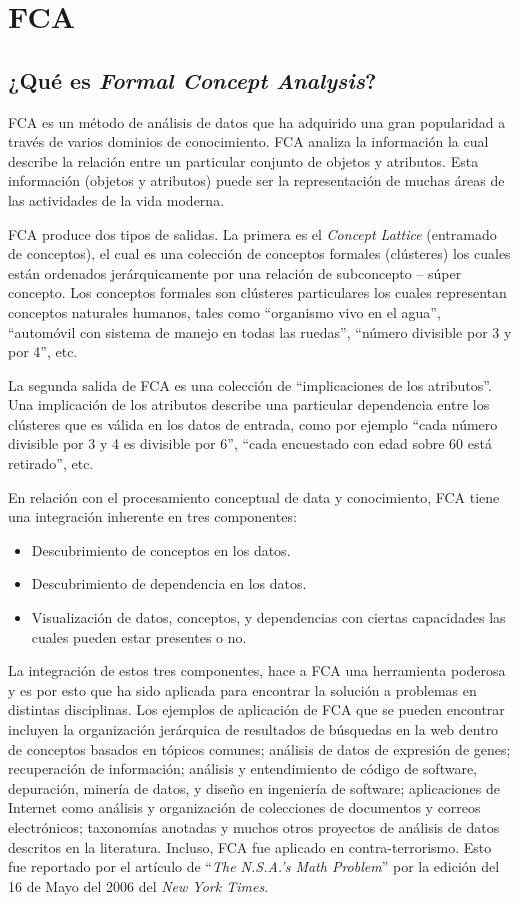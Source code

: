 \documentclass[12pt,oneside,letterpaper]{book}
\newcommand{\eng}[1]{\textit{#1}\xspace}			%
\newcommand{\abr}[1]{\textsc{#1}\xspace}           %
\theoremstyle{definition}
\begin{document}
\section{FCA}
\label{sec:fca}
\subsection{¿Qué es \eng{Formal Concept Analysis}?}
\label{sub:que_es_formal_concept_analysis}
\abr{FCA} es un método de análisis de datos que ha adquirido una gran popularidad a través de varios dominios de conocimiento.  \abr{FCA} analiza la información la cual describe la relación entre un particular conjunto de objetos y atributos. Esta información (objetos y atributos) puede ser la representación de muchas áreas de las actividades de la vida moderna.

\abr{FCA} produce dos tipos de salidas. La primera es el \eng{Concept Lattice} (entramado de conceptos), el cual es una colección de conceptos formales (clústeres) los cuales están ordenados jerárquicamente por una relación de subconcepto – súper concepto. Los conceptos formales son clústeres particulares los cuales representan conceptos naturales humanos, tales como ``organismo vivo en el agua'',  ``automóvil con sistema de manejo en todas las ruedas'', ``número divisible por 3 y por 4'', etc.

La segunda salida de \abr{FCA} es una colección de ``implicaciones de los atributos''. Una implicación de los atributos describe una particular dependencia entre los clústeres que es válida en los datos de entrada, como por ejemplo ``cada número divisible por 3 y 4 es divisible por 6'', ``cada encuestado con edad sobre 60 está retirado'', etc.

En relación con el procesamiento conceptual de data y conocimiento, \abr{FCA} tiene una integración inherente en tres componentes:
\begin{itemize}
	\item Descubrimiento de conceptos en los datos.
	\item Descubrimiento de dependencia en los datos.
	\item Visualización de datos, conceptos, y dependencias con ciertas capacidades las cuales pueden estar presentes o no.
\end{itemize}

La integración de estos tres componentes, hace a \abr{FCA} una herramienta poderosa y es por esto que ha sido aplicada para encontrar la solución a problemas en distintas disciplinas. Los ejemplos de aplicación de \abr{FCA} que se pueden encontrar incluyen la organización jerárquica de resultados de búsquedas en la web dentro de conceptos basados en tópicos comunes; análisis de datos de expresión de genes; recuperación de información; análisis y entendimiento de código de software, depuración, minería de datos, y diseño en ingeniería de software; aplicaciones de Internet como análisis y organización de colecciones de documentos y correos electrónicos; taxonomías anotadas y muchos otros proyectos de análisis de datos descritos en la literatura. Incluso, \abr{FCA} fue aplicado en contra-terrorismo. Esto fue reportado por el artículo de ``\eng{The N.S.A.’s Math Problem}'' por la edición del 16 de Mayo del 2006 del \eng{New York Times}.
\end{document}
